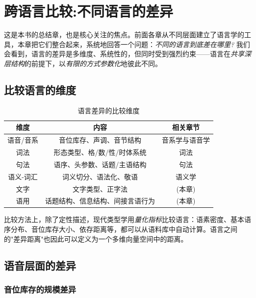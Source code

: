 \clearpage
\vspace*{\fill}
\section{跨语言比较:不同语言的差异}
\begin{center}
这是本书的总结章，也是核心关注的焦点。前面各章从不同层面建立了语言学的工具，本章把它们整合起来，系统地回答一个问题：\emph{不同的语言到底差在哪里?} 我们会看到，语言的差异是多维度、系统性的，但同时受到强烈约束——语言在\emph{共享深层结构}的前提下，以\emph{有限的方式参数化}地彼此不同。
\end{center}
\vspace*{\fill}
\clearpage


\subsection{比较语言的维度}

\begin{table}[H]
\centering
\caption{语言差异的比较维度}
\begin{tabulary}{\textwidth}{@{}CCC@{}}
\toprule
\textbf{维度} & \textbf{内容} & \textbf{相关章节} \\
\midrule
语音/音系 & 音位库存、声调、音节结构 & 音系学与语音学 \\
词法 & 形态类型、格/数/性/时体系统 & 词法 \\
句法 & 语序、头参数、话题/主语结构 & 句法 \\
语义-词汇 & 词义切分、语法化、敬语 & 语义学 \\
文字 & 文字类型、正字法 & (本章) \\
语用 & 话题结构、信息结构、间接言语行为 & (本章) \\
\bottomrule
\end{tabulary}
\end{table}

比较方法上，除了定性描述，现代类型学用\emph{量化指标}比较语言：语素密度、基本语序分布、音位库存大小、依存距离等，都可以从语料库中自动计算。语言之间的"差异距离"也因此可以定义为一个多维向量空间中的距离。

\subsection{语音层面的差异}

\subsubsection{音位库存的规模差异}

